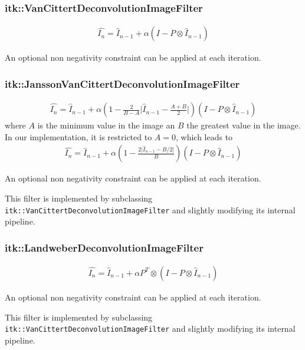 \documentclass{InsightArticle}
\begin{document}
\subsubsection{itk::VanCittertDeconvolutionImageFilter}

\begin{eqnarray}
\label{eq:imageFormation}
\hat{I_n} = \hat{I}_{n-1} + \alpha \left( I -P \otimes \hat{I}_{n-1}  \right)
\end{eqnarray}

An optional non negativity constraint can be applied at each iteration.

\subsubsection{itk::JanssonVanCittertDeconvolutionImageFilter}

\begin{eqnarray}
\label{eq:imageFormation}
\hat{I_n} = \hat{I}_{n-1} + \alpha\left(1-\frac{2}{B-A}\lvert \hat{I}_{n-1}-\frac{A+B}{2}\rvert\right) \left( I - P \otimes \hat{I}_{n-1}  \right)
\end{eqnarray}
where $A$ is the minimum value in the image an $B$ the greatest value in the image.
In our implementation, it is restricted to $A=0$, which leads to
\begin{eqnarray}
\label{eq:imageFormation}
\hat{I_n} = \hat{I}_{n-1} + \alpha\left(1-\frac{2\lvert \hat{I}_{n-1}-B/2\rvert}{B}\right) \left( I - P \otimes \hat{I}_{n-1}  \right)
\end{eqnarray}

An optional non negativity constraint can be applied at each iteration.

This filter is implemented by subclassing \verb$itk::VanCittertDeconvolutionImageFilter$ and slightly
modifying its internal pipeline.

\subsubsection{itk::LandweberDeconvolutionImageFilter}

\begin{eqnarray}
\label{eq:imageFormation}
\hat{I_n} = \hat{I}_{n-1} + \alpha P^T \otimes \left( I - P \otimes \hat{I}_{n-1}  \right)
\end{eqnarray}

An optional non negativity constraint can be applied at each iteration.

This filter is implemented by subclassing \verb$itk::VanCittertDeconvolutionImageFilter$ and slightly
modifying its internal pipeline.
\end{document}
